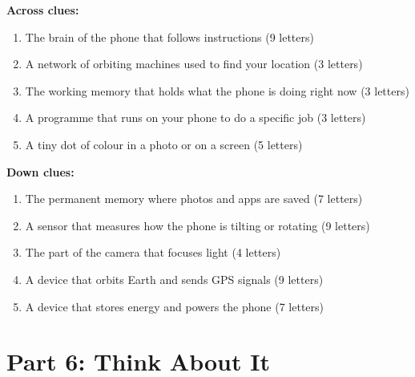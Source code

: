 \begin{tcolorbox}[enhanced,colback=CoralRed!6,colframe=CoralRed,arc=6pt,boxrule=1pt,
  left=10pt,right=10pt,top=8pt,bottom=8pt,
  title={\faPuzzlePiece\quad Smartphone Word Challenge},fonttitle=\bfseries\large]

\textbf{Across clues:}
\begin{enumerate}[label=\textbf{\arabic*.}]
  \item The brain of the phone that follows instructions (9 letters)
  \item A network of orbiting machines used to find your location (3 letters)
  \item The working memory that holds what the phone is doing right now (3 letters)
  \item A programme that runs on your phone to do a specific job (3 letters)
  \item A tiny dot of colour in a photo or on a screen (5 letters)
\end{enumerate}

\vspace{8pt}
\textbf{Down clues:}
\begin{enumerate}[label=\textbf{\arabic*.}]
  \item The permanent memory where photos and apps are saved (7 letters)
  \item A sensor that measures how the phone is tilting or rotating (9 letters)
  \item The part of the camera that focuses light (4 letters)
  \item A device that orbits Earth and sends GPS signals (9 letters)
  \item A device that stores energy and powers the phone (7 letters)
\end{enumerate}
\end{tcolorbox}

\vspace{12pt}

\section*{Part 6: Think About It}

